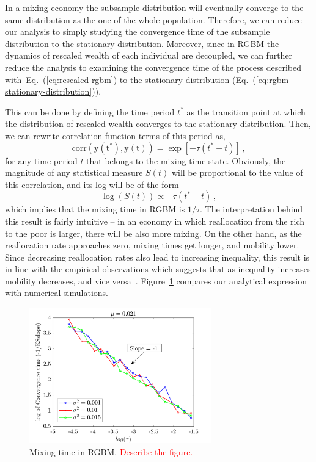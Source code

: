 \documentclass[11pt]{article}
\newcommand{\eref}[1]{Eq.~(\ref{eq:#1})}
\newcommand{\Fref}[1]{Figure~\ref{fig:#1}}
\newcommand{\be}{\begin{equation}}
\newcommand{\ee}{\end{equation}}
\numberwithin{equation}{section}
\begin{document}
In a mixing economy the subsample distribution will eventually converge to the same distribution as the one of the whole population. Therefore, we can reduce our analysis to simply studying the convergence time of the subsample distribution to the stationary distribution. Moreover, since in RGBM the dynamics of rescaled wealth of each individual are decoupled, we can further reduce the analysis to examining the convergence time of the process described with~\eref{rescaled-rgbm} to the stationary distribution (\eref{rgbm-stationary-distribution}).

This can be done by defining the time period $t^*$ as the transition point at which the distribution of rescaled wealth converges to the stationary distribution. Then, we can rewrite correlation function terms of this period as,
%
\be
    \mathrm{corr(y(t^*), y(t))} = \exp\left[ -\tau (t^* -t)\right]\,,
\ee
%
for any time period $t$ that belongs to the mixing time state. Obviously, the magnitude of any statistical measure $S(t)$ will be proportional to the value of this correlation, and its log will be of the form
%
\be
    \log (S(t)) \propto  - \tau (t^*-t)\,,
\ee
%
which implies that the mixing time in RGBM is $1/\tau$. The interpretation behind this result is fairly intuitive -- in an economy in which reallocation from the rich to the poor is larger, there will be also more mixing. On the other hand, as the reallocation rate approaches zero, mixing times get longer, and mobility lower. Since decreasing reallocation rates also lead to increasing inequality, this result is in line with the empirical observations which suggests that as inequality increases mobility decreases, and vice versa~\citep{corak2013}. \Fref{rgbm-mixing-time} compares our analytical expression with numerical simulations.


\begin{figure}[!htb]
\centering
\includegraphics[width=0.7\textwidth]{figs/fig_mixing_time_rgbm.png}
\caption{Mixing time in RGBM. \textcolor{red}{Describe the figure.}
\label{fig:rgbm-mixing-time}}
\end{figure}
\end{document}
